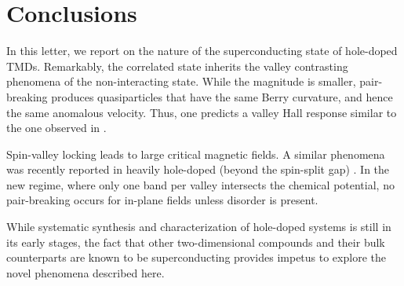 \section{Conclusions}

In this letter, we report on the nature of the superconducting state
of hole-doped TMDs.
Remarkably, the correlated state inherits
the valley contrasting phenomena of the non-interacting state.
While the magnitude is smaller, pair-breaking produces quasiparticles
that have the same Berry curvature, and hence the same anomalous velocity.
Thus, one predicts a valley Hall response similar to
the one observed in .

Spin-valley locking leads to large critical magnetic fields.
A similar phenomena was recently reported in heavily hole-doped
(beyond the spin-split gap) 
\cite{%
  1510.06289v2,%
  PhysRevLett.113.097001%
}.
In the new regime, where only one band per valley intersects
the chemical potential, no pair-breaking occurs
for in-plane fields unless disorder is present.

While systematic synthesis and characterization of hole-doped systems
is still in its early stages, the fact that other two-dimensional compounds
and their bulk counterparts are known to be superconducting
\cite{%
  PhysRevB.88.054515%
}
provides impetus to explore the novel phenomena described here.
